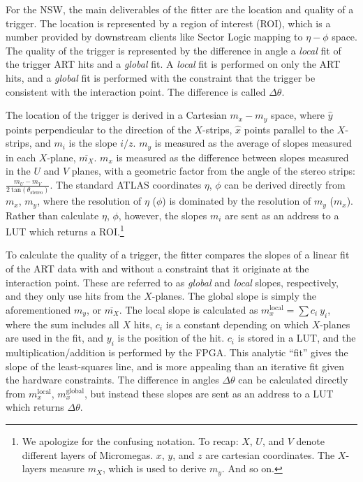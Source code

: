 For the NSW, the main deliverables of the fitter are the location and quality of a trigger. The location is represented by a region of interest (ROI), which is a number provided by downstream clients like Sector Logic mapping to $\eta-\phi$ space. The quality of the trigger is represented by the difference in angle a \textit{local} fit of the trigger ART hits and a \textit{global} fit. A \textit{local} fit is performed on only the ART hits, and a \textit{global} fit is performed with the constraint that the trigger be consistent with the interaction point. The difference is called $\Delta\theta$.

The location of the trigger is derived in a Cartesian $m_x-m_y$ space, where $\hat{y}$ points perpendicular to the direction of the $X$-strips, $\hat{x}$ points parallel to the $X$-strips, and $m_i$ is the slope $i/z$. $m_y$ is measured as the average of slopes measured in each $X$-plane, $\overline{m_X}$. $m_x$ is measured as the difference between slopes measured in the $U$ and $V$ planes, with a geometric factor from the angle of the stereo strips: $\frac{m_U - m_V}{2\ \text{tan}(\theta_\text{stereo})}$. The standard ATLAS coordinates $\eta$, $\phi$ can be derived directly from $m_x$, $m_y$, where the resolution of $\eta$ ($\phi$) is dominated by the resolution of $m_y$ ($m_x$). Rather than calculate $\eta$, $\phi$, however, the slopes $m_i$ are sent as an address to a LUT which returns a ROI.\footnote{We apologize for the confusing notation. To recap: $X$, $U$, and $V$ denote different layers of Micromegas. $x$, $y$, and $z$ are cartesian coordinates. The $X$-layers measure $m_X$, which is used to derive $m_y$. And so on.}

To calculate the quality of a trigger, the fitter compares the slopes of a linear fit of the ART data with and without a constraint that it originate at the interaction point. These are referred to as \textit{global} and \textit{local} slopes, respectively, and they only use hits from the $X$-planes. The global slope is simply the aforementioned $m_y$, or $\overline{m_X}$. The local slope is calculated as $m_x^\text{local} = \sum c_i \ y_i$, where the sum includes all $X$ hits, $c_i$ is a constant depending on which $X$-planes are used in the fit, and $y_i$ is the position of the hit. $c_i$ is stored in a LUT, and the multiplication/addition is performed by the FPGA. This analytic ``fit'' gives the slope of the least-squares line, and is more appealing than an iterative fit given the hardware constraints. The difference in angles $\Delta\theta$ can be calculated directly from $m_x^\text{local}$, $m_x^\text{global}$, but instead these slopes are sent as an address to a LUT which returns $\Delta\theta$.


